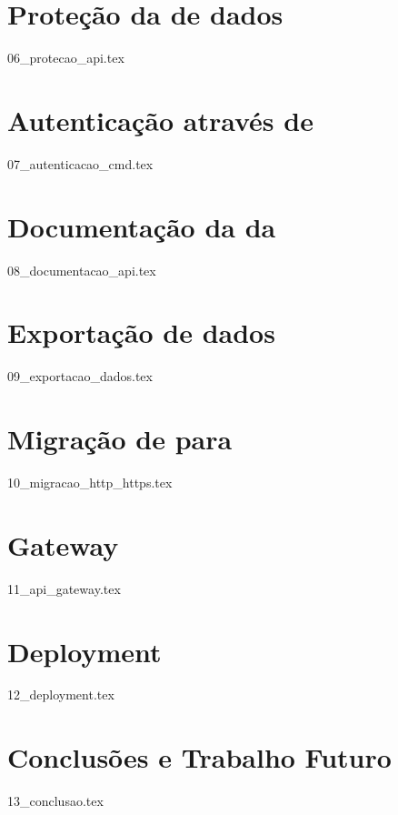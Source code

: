 \documentclass[
  oneside,
  12pt, a4paper,
  footinclude=true,
  headinclude=true,
  cleardoublepage=empty
]{scrbook}
\begin{document}
    \chapter{Proteção da  de dados}
    {06_protecao_api.tex}

    \chapter{Autenticação através de }
    {07_autenticacao_cmd.tex}

    \chapter{Documentação da  da }
    {08_documentacao_api.tex}

	\chapter{Exportação de dados}
    {09_exportacao_dados.tex}

    \chapter{Migração de  para }
    {10_migracao_http_https.tex}

    \chapter{ Gateway}
    {11_api_gateway.tex}

	\chapter{Deployment}
    {12_deployment.tex}
		
	\chapter{Conclusões e Trabalho Futuro}
    {13_conclusao.tex}
			

	

	

	
\end{document}
